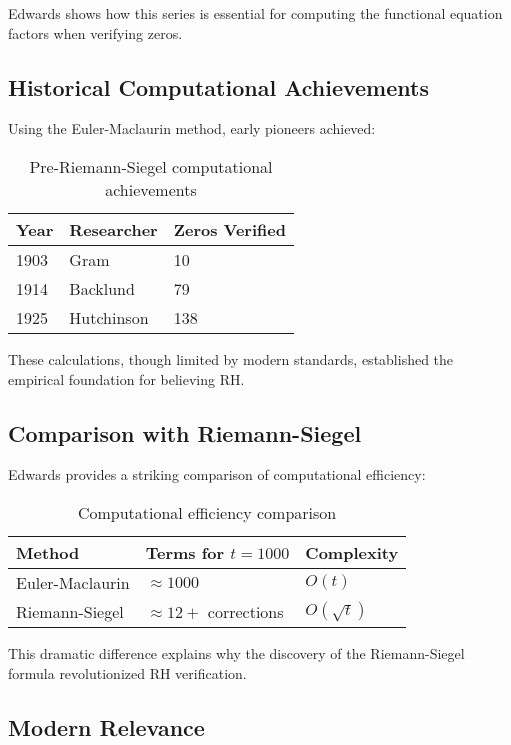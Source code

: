 Edwards shows how this series is essential for computing the functional equation factors when verifying zeros.

\subsection{Historical Computational Achievements}

Using the Euler-Maclaurin method, early pioneers achieved:

\begin{table}[h]
\centering
\begin{tabular}{|l|l|l|}
\hline
\textbf{Year} & \textbf{Researcher} & \textbf{Zeros Verified} \\
\hline
1903 & Gram & 10 \\
1914 & Backlund & 79 \\
1925 & Hutchinson & 138 \\
\hline
\end{tabular}
\caption{Pre-Riemann-Siegel computational achievements}
\end{table}

These calculations, though limited by modern standards, established the empirical foundation for believing RH.

\subsection{Comparison with Riemann-Siegel}

Edwards provides a striking comparison of computational efficiency:

\begin{table}[h]
\centering
\begin{tabular}{|l|l|l|}
\hline
\textbf{Method} & \textbf{Terms for $t = 1000$} & \textbf{Complexity} \\
\hline
Euler-Maclaurin & $\approx 1000$ & $O(t)$ \\
Riemann-Siegel & $\approx 12 + $ corrections & $O(\sqrt{t})$ \\
\hline
\end{tabular}
\caption{Computational efficiency comparison}
\end{table}

This dramatic difference explains why the discovery of the Riemann-Siegel formula revolutionized RH verification.

\subsection{Modern Relevance}

